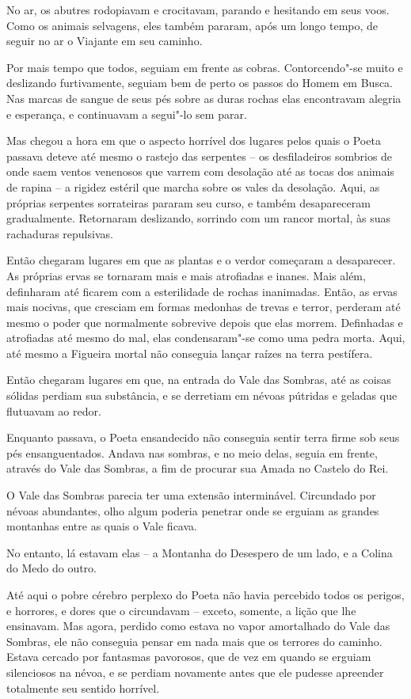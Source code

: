No ar, os abutres rodopiavam e crocitavam, parando e hesitando em seus
voos. Como os animais selvagens, eles também pararam, após um longo
tempo, de seguir no ar o Viajante em seu caminho.

Por mais tempo que todos, seguiam em frente as cobras. Contorcendo"-se
muito e deslizando furtivamente, seguiam bem de perto os passos do
Homem em Busca. Nas marcas de sangue de seus pés sobre as duras rochas
elas encontravam alegria e esperança, e continuavam a segui"-lo sem parar.

Mas chegou a hora em que o aspecto horrível dos lugares pelos quais o
Poeta passava deteve até mesmo o rastejo das serpentes -- os
desfiladeiros sombrios de onde saem ventos venenosos que varrem com
desolação até as tocas dos animais de rapina -- a rigidez estéril que
marcha sobre os vales da desolação. Aqui, as próprias serpentes
sorrateiras pararam seu curso, e também desapareceram gradualmente.
Retornaram deslizando, sorrindo com um rancor mortal, às suas rachaduras
repulsivas.

Então chegaram lugares em que as plantas e o verdor começaram a
desaparecer. As próprias ervas se tornaram mais e mais atrofiadas e
inanes. Mais além, definharam até ficarem com a esterilidade de rochas
inanimadas. Então, as ervas mais nocivas, que cresciam em formas
medonhas de trevas e terror, perderam até mesmo o poder que
normalmente sobrevive depois que elas morrem. Definhadas e atrofiadas
até mesmo do mal, elas condensaram"-se como uma pedra morta. Aqui, até mesmo
a Figueira mortal não conseguia lançar raízes na terra pestífera.

Então chegaram lugares em que, na entrada do Vale das Sombras, até as
coisas sólidas perdiam sua substância, e se derretiam em névoas pútridas
e geladas que flutuavam ao redor.

Enquanto passava, o Poeta ensandecido não conseguia sentir terra firme
sob seus pés ensanguentados. Andava nas sombras, e no meio delas,
seguia em frente, através do Vale das Sombras, a fim de procurar sua Amada no
Castelo do Rei.

O Vale das Sombras parecia ter uma extensão interminável. Circundado por
névoas abundantes, olho algum poderia penetrar onde se erguiam as
grandes montanhas entre as quais o Vale ficava.

No entanto, lá estavam elas -- a Montanha do Desespero de um lado, e a
Colina do Medo do outro.

Até aqui o pobre cérebro perplexo do Poeta não havia percebido todos os
perigos, e horrores, e dores que o circundavam -- exceto, somente, a
lição que lhe ensinavam. Mas agora, perdido como estava no vapor amortalhado
do Vale das Sombras, ele não conseguia pensar em nada mais que os
terrores do caminho. Estava cercado por fantasmas pavorosos, que de vez
em quando se erguiam silenciosos na névoa, e se perdiam novamente antes
que ele pudesse apreender totalmente seu sentido horrível.

